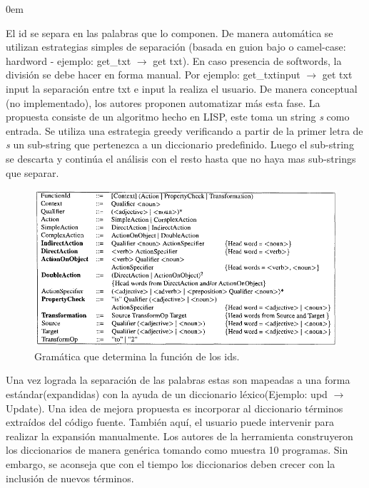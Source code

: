 \documentclass[a4paper,12pt]{report}
\begin{document}
\begin{description}
\itemsep0em%
\item[Segmentation:] El id se separa en las palabras que lo componen. De manera automática se utilizan estrategias simples de separación (basada en guion bajo o camel-case: hardword - ejemplo: \textsf{get\_txt} $\rightarrow$ \textsf{get txt}). En caso presencia de softwords, la división se debe hacer en forma manual. Por ejemplo: \textsf{get\_txtinput} $\rightarrow$ \textsf{get txt input} la separación entre \textsf{txt} e \textsf{input} la realiza el usuario. De manera conceptual (no implementado), los autores proponen automatizar más esta fase. La propuesta consiste de un algoritmo hecho en LISP, este toma un string \textit{s} como entrada. Se utiliza una estrategia greedy verificando a partir de la primer letra de \textit{s} un sub-string que pertenezca a un diccionario predefinido. Luego el sub-string se descarta y continúa el análisis con el resto hasta que no haya mas sub-strings que separar\cite{BCPT99}.

\begin{figure}[h] %
\centerline{%
\includegraphics[scale= 0.60]{./ire_3.png}
}
\caption{Gramática que determina la función de los ids.}
\label{ire3}
\end{figure}

\item[Standard Lexicon:] Una vez lograda la separación de las palabras estas son mapeadas a una forma estándar(expandidas) con la ayuda de un diccionario léxico\cite{BCPT99}(Ejemplo: \textsf{upd} $\rightarrow$ \textsf{Update}). Una idea de mejora propuesta es incorporar al diccionario términos extraídos del código fuente. También aquí, el usuario puede intervenir para realizar la expansión manualmente. Los autores\cite{BCPT00} de la herramienta construyeron los diccionarios de manera genérica tomando como muestra 10 programas. Sin embargo, se aconseja que con el tiempo los diccionarios deben crecer con la inclusión de nuevos términos.


\end{description}
\end{document}
